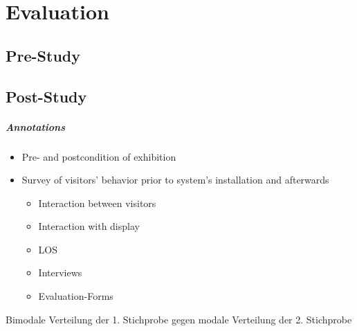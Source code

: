 \chapter{Evaluation}
\label{evaluation}


\section{Pre-Study}
\label{evaluation_pre}


\section{Post-Study}
\label{evaluation_post}

\paragraph{Annotations}

\begin{itemize}
	\item Pre- and postcondition of exhibition
	\item Survey of visitors' behavior prior to system's installation and afterwards
	\begin{itemize}
		\item Interaction between visitors
		\item Interaction with display
		\item \ac{LOS}
		\item Interviews
		\item Evaluation-Forms
	\end{itemize}
\end{itemize}

Bimodale Verteilung der 1. Stichprobe gegen modale Verteilung der 2. Stichprobe

